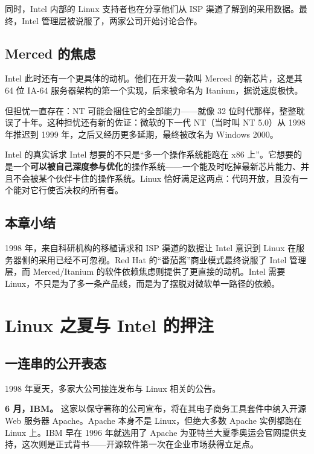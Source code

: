 \documentclass[a4paper]{article}
\begin{document}
同时，Intel 内部的 Linux 支持者也在分享他们从 ISP 渠道了解到的采用数据。最终，Intel 管理层被说服了，两家公司开始讨论合作。

\subsection{Merced 的焦虑}

Intel 此时还有一个更具体的动机。他们在开发一款叫 Merced 的新芯片，这是其 64 位 IA-64 服务器架构的第一个实现，后来被命名为 Itanium，据说速度极快。

但担忧一直存在：NT 可能会捆住它的全部能力——就像 32 位时代那样，整整耽误了十年。这种担忧还有新的佐证：微软的下一代 NT（当时叫 NT 5.0）从 1998 年推迟到 1999 年，之后又经历更多延期，最终被改名为 Windows 2000。

\begin{importantbox}{Intel 的真实诉求}
Intel 想要的不只是“多一个操作系统能跑在 x86 上”。它想要的是一个\textbf{可以被自己深度参与优化}的操作系统——一个能及时吃掉最新芯片能力、并且不会被某个伙伴卡住的操作系统。Linux 恰好满足这两点：代码开放，且没有一个能对它行使否决权的所有者。
\end{importantbox}

\subsection{本章小结}
1998 年，来自科研机构的移植请求和 ISP 渠道的数据让 Intel 意识到 Linux 在服务器侧的采用已经不可忽视。Red Hat 的“番茄酱”商业模式最终说服了 Intel 管理层，而 Merced/Itanium 的软件依赖焦虑则提供了更直接的动机。Intel 需要 Linux，不只是为了多一条产品线，而是为了摆脱对微软单一路径的依赖。

\section{Linux 之夏与 Intel 的押注}

\subsection{一连串的公开表态}

1998 年夏天，多家大公司接连发布与 Linux 相关的公告。

\textbf{6 月，IBM。} 这家以保守著称的公司宣布，将在其电子商务工具套件中纳入开源 Web 服务器 Apache。Apache 本身不是 Linux，但绝大多数 Apache 实例都跑在 Linux 上。IBM 早在 1996 年就选用了 Apache 为亚特兰大夏季奥运会官网提供支持，这次则是正式背书——开源软件第一次在企业市场获得立足点。
\end{document}
